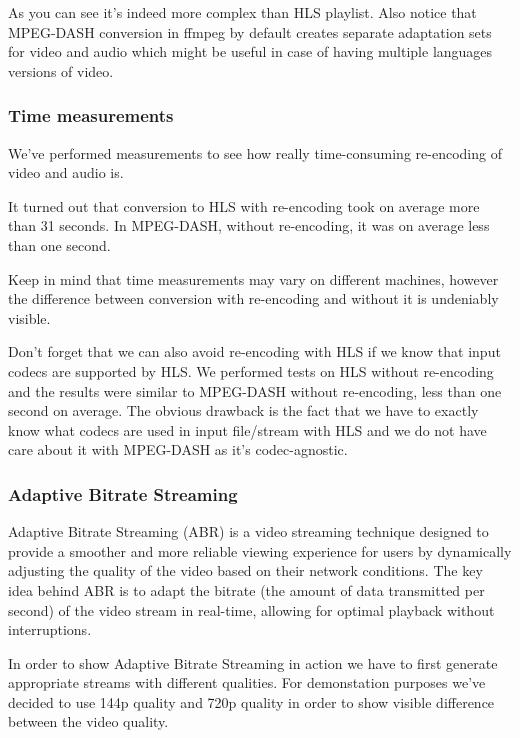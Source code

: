 \documentclass{article}
\begin{document}
As you can see it's indeed more complex than HLS playlist. Also notice
that MPEG-DASH conversion in ffmpeg by default creates separate
adaptation sets for video and audio which might be useful in case of
having multiple languages versions of video.

\subsubsection{Time measurements}\label{measurements}

We've performed measurements to see how really time-consuming
re-encoding of video and audio is.

It turned out that conversion to HLS with re-encoding took on average
more than 31 seconds. In MPEG-DASH, without re-encoding, it was on
average less than one second.

Keep in mind that time measurements may vary on different machines,
however the difference between conversion with re-encoding and without
it is undeniably visible.

Don't forget that we can also avoid re-encoding with HLS if we know that
input codecs are supported by HLS. We performed tests on HLS without
re-encoding and the results were similar to MPEG-DASH without
re-encoding, less than one second on average. The obvious drawback is
the fact that we have to exactly know what codecs are used in input
file/stream with HLS and we do not have care about it with MPEG-DASH as
it's codec-agnostic.

\subsubsection{Adaptive Bitrate
Streaming}\label{adaptive-bitrate-streaming}

Adaptive Bitrate Streaming (ABR) is a video streaming technique designed
to provide a smoother and more reliable viewing experience for users by
dynamically adjusting the quality of the video based on their network
conditions. The key idea behind ABR is to adapt the bitrate (the amount
of data transmitted per second) of the video stream in real-time,
allowing for optimal playback without interruptions.

In order to show Adaptive Bitrate Streaming in action we have to first
generate appropriate streams with different qualities. For demonstation
purposes we've decided to use 144p quality and 720p quality in order to
show visible difference between the video quality.
\end{document}
